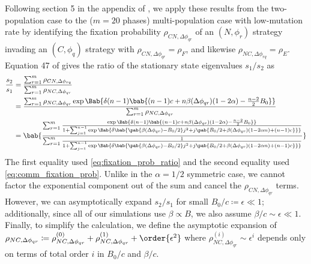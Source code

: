 Following section 5 in the appendix of \tripp{},
we apply these results from the two-population case
to the ($m=20$ phases) multi-population case with low-mutation rate
by identifying the fixation probability $\rho_{CN,\Delta \phi_{qr}}$
of an $(N,\phi_r)$ strategy invading an $(C,\phi_q)$ strategy
with $\rho_{CN,\Delta \phi_{qr}} = \rho_F$,
and likewise
$\rho_{NC,\Delta \phi_{rq}} = \rho_E$.
Equation 47 of \tripp{}
gives the ratio of the stationary state eigenvalues $s_1/s_2$ as
\begin{align}
  \frac{s_2}{s_1} &= \frac
    {\sum_{r=1}^{m} \rho_{CN,\Delta \phi_{rq}}}
    {\sum_{r=1}^{m} \rho_{NC,\Delta \phi_{qr}} }
  \\
  &=
  \frac
  {\sum_{r=1}^{m} \rho_{NC,\Delta \phi_{qr}}
    \exp \Bab{
      \delta (n-1)
      \bab{
        (n-1) c + n \beta(\Delta \phi_{qr}) (1 - 2 \alpha)
        - \frac{n-2}{2} B_0
      }
    }
  }
  {\sum_{r=1}^{m} \rho_{NC,\Delta \phi_{qr}}}
  \\
  &=
  \bab{
    \frac
    {\sum_{r=1}^{m} \frac
      {\exp \Bab{ \delta (n-1)
        \bab{
          (n-1) c + n \beta(\Delta \phi_{qr}) (1 - 2 \alpha) - \frac{n-2}{2} B_0
        }}
      }
      {1 + \sum_{j=1}^{n-1} \exp\Bab{
        \delta \bab{
         \pab{\beta(\Delta \phi_{qr}) - B_0/2} j^2
         + j \pab{B_0/2 + \beta(\Delta \phi_{qr}) (1 - 2 \alpha n) + (n-1) c}
        }}
      }
    }
    {\sum_{r=1}^{m} \frac{1}
      {1 + \sum_{j=1}^{n-1} \exp\Bab{
        \delta \bab{
         \pab{\beta(\Delta \phi_{qr}) - B_0/2} j^2
         + j \pab{B_0/2 + \beta(\Delta \phi_{qr}) (1 - 2 \alpha n) + (n-1) c}
        }}
      }
    }
  }
  \label{eq:full_analytic_frac}
\end{align}
The first equality used \cref{eq:fixation_prob_ratio}
and the second equality used \cref{eq:comm_fixation_prob}.
Unlike in the $\alpha = 1/2$ symmetric case, we cannot factor the
exponential component out of the sum and cancel the $\rho_{CN,\Delta
\phi_{qr}}$ terms.
However, we can asymptotically expand $s_2/s_1$ for small
$B_0/c \coloneqq \epsilon \ll 1$;
additionally, since all of our simulations use $\beta \propto B$,
we also assume $\beta/c \sim \epsilon \ll 1$.
Finally, to simplify the calculation,
we define the asymptotic expansion of
$\rho_{NC,\Delta \phi_{qr}} \coloneqq
\rho_{NC,\Delta \phi_{qr}}^{(0)}
+
\rho_{NC,\Delta \phi_{qr}}^{(1)}
+
\order{\epsilon^2}
$
where
$
\rho_{NC,\Delta \phi_{qr}}^{(i)} \sim \epsilon^i
$
depends only on terms of total order $i$ in $B_0/c$ and $\beta/c$.

